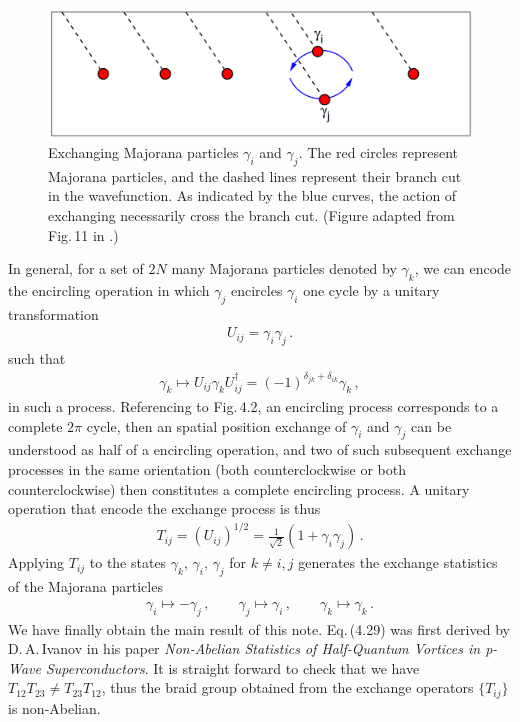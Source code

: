 \documentclass[11pt, oneside]{book}
\theoremstyle{break}
\theoremstyle{break}
\begin{document}
\begin{figure}[b]
\centering
\includegraphics[scale=0.45]{3}
\caption{\small Exchanging Majorana particles $\gamma_i$ and $\gamma_j$. The red circles represent Majorana particles, and the dashed lines represent their branch cut in the wavefunction. As indicated by the blue curves, the action of exchanging necessarily cross the branch cut. (Figure adapted from Fig.\,11 in \cite{Review}.)\normalsize}
\end{figure}

In general, for a set of $2N$ many Majorana particles denoted by $\gamma_k$, we can encode the encircling operation in which $\gamma_j$ encircles $\gamma_i$ one cycle by a unitary transformation
\begin{align}
U_{ij} =\gamma_i \gamma_j\,.
\end{align}
such that 
\begin{align}
\gamma_k\mapsto U_{ij} \gamma_{k} U_{ij}^\dagger=(-1)^{\delta_{jk}+\delta_{ik}} \gamma_k \,,
\end{align}
in such a process. Referencing to Fig.\,4.2, an encircling process corresponds to a complete $2\pi$ cycle, then an spatial position exchange of $\gamma_i$ and $\gamma_j$ can be understood as half of a encircling operation, and two of such subsequent exchange processes in the same orientation (both counterclockwise or both counterclockwise) then constitutes a complete encircling process. A unitary operation that encode the exchange process is thus
\begin{align}
T_{ij} = (U_{ij})^{1/2} = \frac{1}{\sqrt{2}}\left( 1+ \gamma_i \gamma_j\right)\,.
\end{align} 
Applying $T_{ij}$ to the states $\gamma_k,\, \gamma_i,\, \gamma_j$ for $k\neq i,j$ generates the exchange statistics of the Majorana particles
\begin{align}
\gamma_i \mapsto -\gamma_j \,,\qquad
\gamma_j \mapsto \gamma_i \,,\qquad
\gamma_k \mapsto \gamma_k\,.
\end{align}
We have finally obtain the main result of this note. Eq.\,(4.29) was first derived by D.\,A.\,Ivanov in his paper \textit{Non-Abelian Statistics of Half-Quantum Vortices in p-Wave Superconductors}. It is straight forward to check that we have $T_{12}T_{23} \neq T_{23}T_{12}$, thus the braid group obtained from the exchange operators $\{T_{ij}\}$ is non-Abelian.
\end{document}
